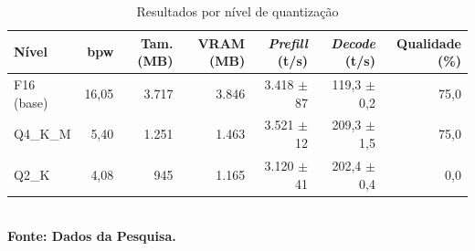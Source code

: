 \begin{table}[htb]
\centering
\caption{Resultados por nível de quantização}
\label{tab:resultados}
\begin{tabular}{lrrrrrr}
\hline
\textbf{Nível} & \textbf{bpw} & \textbf{Tam. (MB)} & \textbf{VRAM (MB)} & \textbf{\textit{Prefill} (t/s)} & \textbf{\textit{Decode} (t/s)} & \textbf{Qualidade (\%)} \\
\hline
F16 (base) & 16,05 & 3.717 & 3.846 & 3.418 $\pm$ 87 & 119,3 $\pm$ 0,2 & 75,0 \\
Q4\_K\_M & 5,40 & 1.251 & 1.463 & 3.521 $\pm$ 12 & 209,3 $\pm$ 1,5 & 75,0 \\
Q2\_K & 4,08 & 945 & 1.165 & 3.120 $\pm$ 41 & 202,4 $\pm$ 0,4 & 0,0 \\
\hline
\end{tabular}
\\[2pt]{\footnotesize \textbf{Fonte: Dados da Pesquisa.}}
\end{table}
